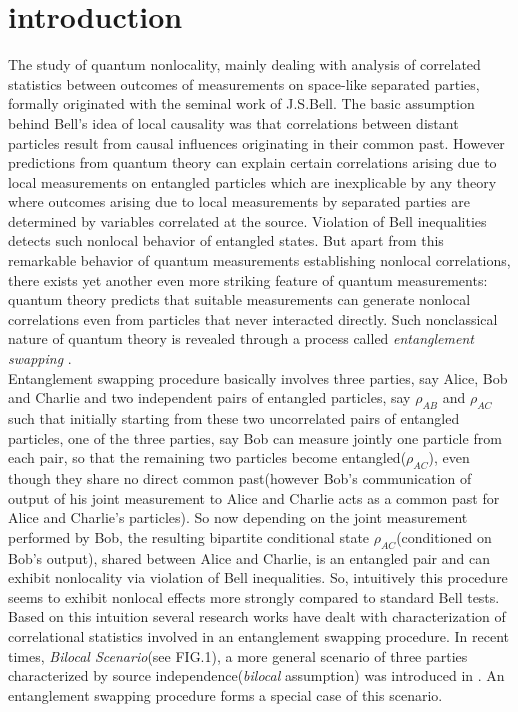 \documentclass[pra,10pt,twocolumn,superscriptaddress,floatfix,showpacs]{revtex4-1}
\begin{document}
\date{\today}


\maketitle
\section{introduction}
The study of quantum nonlocality, mainly dealing with analysis of correlated statistics between outcomes of measurements on space-like separated parties, formally originated with the seminal work of J.S.Bell\cite{Bel,Bel2}. The basic assumption behind Bell's idea of local causality was that correlations between distant particles result from causal influences originating in their common past. However predictions from quantum theory can explain certain correlations arising due to local measurements on entangled particles which are inexplicable by any theory where outcomes arising due to local measurements by separated parties are determined by variables correlated at the source\cite{Brunreview}. Violation of Bell inequalities detects such nonlocal behavior of entangled states. But apart from this remarkable behavior of quantum measurements establishing nonlocal correlations, there exists yet another even more striking feature of quantum measurements: quantum theory predicts that suitable measurements can generate nonlocal correlations even from particles that never  interacted directly. Such nonclassical nature of quantum theory is revealed through a process called \textit{entanglement swapping} \cite{ES1}. \\
Entanglement swapping procedure basically involves three parties, say Alice, Bob and Charlie and two independent pairs of entangled particles, say $\rho_{AB}$ and $\rho_{AC}$ such that initially  starting from these two uncorrelated pairs of entangled particles, one of the three parties, say Bob can measure jointly one particle from each pair, so that the remaining two particles become entangled($\rho_{AC}$), even though they share no direct common past(however Bob's  communication of output of his joint measurement to Alice and Charlie acts as a common past for Alice and Charlie's particles). So now depending on the joint measurement performed by Bob, the resulting bipartite conditional state $\rho_{AC}$(conditioned on Bob's output), shared between Alice and Charlie, is an entangled pair and can exhibit nonlocality via violation of Bell inequalities. So, intuitively this procedure seems to exhibit nonlocal effects more strongly compared to standard Bell tests\cite{Cl}. Based on this intuition several research works have dealt with characterization of correlational statistics involved in an entanglement swapping procedure. In recent times, \textit{Bilocal Scenario}(see FIG.1), a  more general scenario of three parties characterized by source independence(\textit{bilocal} assumption) was introduced in \cite{BRA}. An entanglement swapping procedure forms a special case of this scenario. \\
\end{document}
